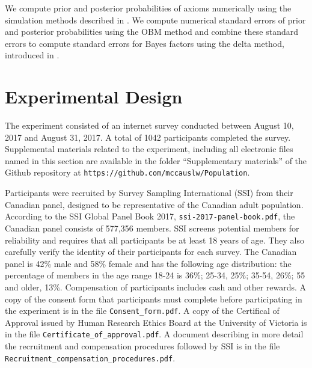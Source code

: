 \documentclass[11pt,letter]{article}
\begin{document}
We compute prior and posterior probabilities of axioms numerically using the simulation methods described in .
We compute numerical standard errors of prior and posterior probabilities using the OBM method and combine these standard errors to compute standard errors for Bayes factors using the delta method, introduced in .

\section{Experimental Design}\label{s:design}

The experiment consisted of an internet survey conducted between August 10, 2017 and August 31, 2017.
A total of 1042 participants completed the survey.
Supplemental materials related to the experiment, including all electronic files named in this section are available in the folder ``Supplementary materials'' of the Github repository at \texttt{https://github.com/mccauslw/Population}.

Participants were recruited by Survey Sampling International (SSI) from their Canadian panel, designed to be representative of the Canadian adult population.
According to the SSI Global Panel Book 2017, \texttt{ssi-2017-panel-book.pdf}, the Canadian panel consists of 577,356 members.
SSI screens potential members for reliability and requires that all participants be at least 18 years of age.
They also carefully verify the identity of their participants for each survey.
The Canadian panel is 42\% male and 58\% female and has the following age distribution: the percentage of members in the age range 18-24 is 36\%; 25-34, 25\%; 35-54, 26\%; 55 and older, 13\%.
Compensation of participants includes cash and other rewards.
A copy of the consent form that participants must complete before participating in the experiment is in the file \texttt{Consent\_form.pdf}.
A copy of the Certifical of Approval issued by Human Research Ethics Board at the University of Victoria is in the file \texttt{Certificate\_of\_approval.pdf}.
A document describing in more detail the recruitment and compensation procedures followed by SSI is in the file \texttt{Recruitment\_compensation\_procedures.pdf}.
\end{document}
